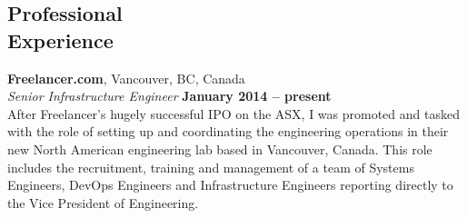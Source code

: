 \documentclass[margin,line]{resume}
\begin{document}
\begin{resume}







    \section{\mysidestyle Professional\\Experience}
    \textbf{Freelancer.com}, Vancouver, BC, Canada \vspace{2mm}\\\vspace{1mm}%
    \textsl{Senior Infrastructure Engineer} \hfill \textbf{January 2014 -- present}\\
    After Freelancer's hugely successful IPO on the ASX, I was promoted and tasked with the role of setting up and coordinating
    the engineering operations in their new North American engineering lab based in Vancouver, Canada. This role includes the 
    recruitment, training and management of a team of Systems Engineers, DevOps Engineers and Infrastructure Engineers reporting directly
    to the Vice President of Engineering.


\end{resume}
\end{document}

